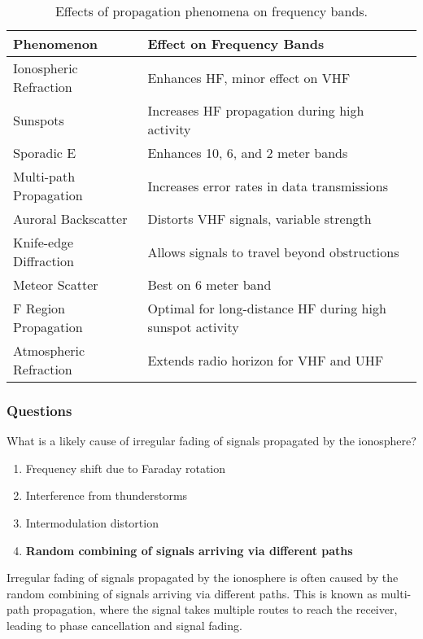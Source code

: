 \begin{table}[h]
    \centering
    \caption{Effects of propagation phenomena on frequency bands.}
    \label{tab:propagation-effects}
    \begin{tabular}{|l|l|}
        \hline
        \textbf{Phenomenon} & \textbf{Effect on Frequency Bands} \\
        \hline
        Ionospheric Refraction & Enhances HF, minor effect on VHF \\
        Sunspots & Increases HF propagation during high activity \\
        Sporadic E & Enhances 10, 6, and 2 meter bands \\
        Multi-path Propagation & Increases error rates in data transmissions \\
        Auroral Backscatter & Distorts VHF signals, variable strength \\
        Knife-edge Diffraction & Allows signals to travel beyond obstructions \\
        Meteor Scatter & Best on 6 meter band \\
        F Region Propagation & Optimal for long-distance HF during high sunspot activity \\
        Atmospheric Refraction & Extends radio horizon for VHF and UHF \\
        \hline
    \end{tabular}
\end{table}

\subsubsection{Questions}

\begin{tcolorbox}[colback=gray!10!white,colframe=black!75!black,title={T3A08}]
    What is a likely cause of irregular fading of signals propagated by the ionosphere?
    \begin{enumerate}[label=\Alph*),noitemsep]
        \item Frequency shift due to Faraday rotation
        \item Interference from thunderstorms
        \item Intermodulation distortion
        \item \textbf{Random combining of signals arriving via different paths}
    \end{enumerate}
\end{tcolorbox}
Irregular fading of signals propagated by the ionosphere is often caused by the random combining of signals arriving via different paths. This is known as multi-path propagation, where the signal takes multiple routes to reach the receiver, leading to phase cancellation and signal fading.

